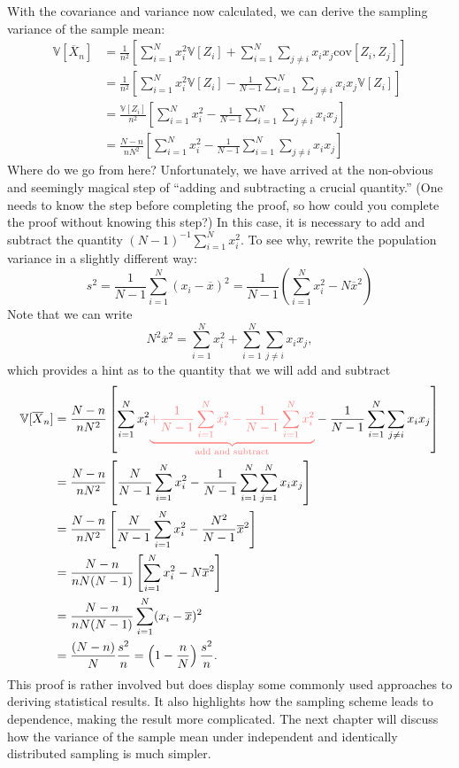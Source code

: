 \documentclass[
  13pt,
  letterpaper,
  DIV=11,
  numbers=noendperiod]{scrreprt}
\newcommand{\V}{\mathbb{V}}
\newcommand{\cov}{\text{cov}}
\newcommand{\Xbar}{\overline{X}}
\theoremstyle{plain}
\theoremstyle{plain}
\theoremstyle{definition}
\theoremstyle{definition}
\theoremstyle{remark}
\begin{document}
With the covariance and variance now calculated, we can derive the
sampling variance of the sample mean: \[
\begin{aligned}
\V[\Xbar_{n}] &=  \frac{1}{n^2}\left[\sum_{i=1}^N x_i^2\V[Z_i] + \sum_{i=1}^N\sum_{j\neq i} x_ix_j\cov[Z_i,Z_j]\right] \\
&=  \frac{1}{n^2}\left[\sum_{i=1}^N x_i^2\V[Z_i] - \frac{1}{N-1} \sum_{i=1}^N\sum_{j\neq i} x_ix_j\V[Z_i]\right] \\
&=  \frac{\V[Z_i]}{n^2}\left[\sum_{i=1}^N x_i^2 - \frac{1}{N-1} \sum_{i=1}^N\sum_{j\neq i} x_ix_j\right] \\
&=  \frac{N-n}{nN^2}\left[\sum_{i=1}^N x_i^2 - \frac{1}{N-1} \sum_{i=1}^N\sum_{j\neq i} x_ix_j\right]
\end{aligned}
\] Where do we go from here? Unfortunately, we have arrived at the
non-obvious and seemingly magical step of ``adding and subtracting a
crucial quantity.'' (One needs to know the step before completing the
proof, so how could you complete the proof without knowing this step?)
In this case, it is necessary to add and subtract the quantity
\((N-1)^{-1} \sum_{i=1}^N x_i^2\). To see why, rewrite the population
variance in a slightly different way: \[
s^2 = \frac{1}{N-1}\sum_{i=1}^N (x_i - \overline{x})^2 = \frac{1}{N-1} \left(\sum_{i=1}^N x_i^2  - N\overline{x}^2\right)
\] Note that we can write \[
N^2\overline{x}^2 = \sum_{i=1}^N x_i^2 + \sum_{i=1}^N \sum_{j\neq i} x_ix_j, 
\] which provides a hint as to the quantity that we will add and
subtract \[
\begin{aligned}
\V[\Xbar_{n}] &=  \frac{N-n}{nN^2}\left[\sum_{i=1}^N x_i^2  \textcolor{red!50}{\underbrace{+ \frac{1}{N-1}\sum_{i=1}^N x_i^2 - \frac{1}{N-1}\sum_{i=1}^N x_i^2}_{\text{add and subtract}}} - \frac{1}{N-1} \sum_{i=1}^N\sum_{j\neq i} x_ix_j\right] \\
&=  \frac{N-n}{nN^2}\left[\frac{N}{N-1}\sum_{i=1}^N x_i^2  - \frac{1}{N-1} \sum_{i=1}^N\sum_{j=1}^N x_ix_j\right] \\
&=  \frac{N-n}{nN^2}\left[\frac{N}{N-1}\sum_{i=1}^N x_i^2  - \frac{N^2}{N-1} \overline{x}^2\right] \\
&=  \frac{N-n}{nN(N-1)}\left[\sum_{i=1}^N x_i^2  - N \overline{x}^2\right] \\
&=  \frac{N-n}{nN(N-1)}\sum_{i=1}^N (x_i - \overline{x})^2 \\
&= \frac{(N-n)}{N}\frac{s^2}{n} = \left(1 - \frac{n}{N}\right)\frac{s^2}{n}.
\end{aligned}
\] This proof is rather involved but does display some commonly used
approaches to deriving statistical results. It also highlights how the
sampling scheme leads to dependence, making the result more complicated.
The next chapter will discuss how the variance of the sample mean under
independent and identically distributed sampling is much simpler.
\end{document}
